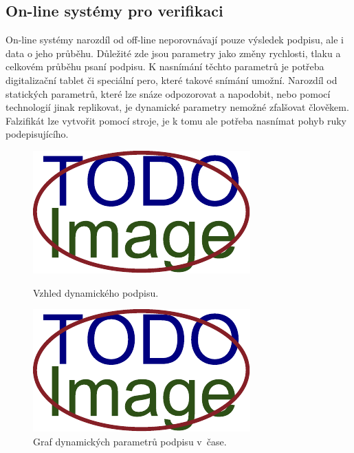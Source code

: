 \subsection{On-line systémy pro verifikaci} %
On-line systémy narozdíl od off-line neporovnávají pouze výsledek podpisu, ale i data o jeho průběhu.         %
Důležité zde jsou parametry jako změny rychlosti, tlaku a celkovém průběhu psaní podpisu.                     %
K nasnímání těchto parametrů je potřeba digitalizační tablet či speciální pero, které takové snímání umožní.  %
Narozdíl od statických parametrů, které lze snáze odpozorovat a napodobit,                                    %
nebo pomocí technologií jinak replikovat, je dynamické parametry nemožné zfalšovat člověkem.                  %
Falzifikát lze vytvořit pomocí stroje, je k tomu ale potřeba nasnímat pohyb ruky podepisujícího.              %

\begin{figure}[h]
  \centering
  \begin{minipage}{0.45\textwidth}
      \centering
      \includegraphics[width=\textwidth]{obrazky-figures/placeholder.pdf}
      \caption{Vzhled dynamického podpisu.}
      \label{fig:first-image}
  \end{minipage}\hfill
  \begin{minipage}{0.45\textwidth}
      \centering
      \includegraphics[width=\textwidth]{obrazky-figures/placeholder.pdf}
      \caption{Graf dynamických parametrů podpisu v~čase.}
      \label{fig:second-image}
  \end{minipage}
\end{figure}

